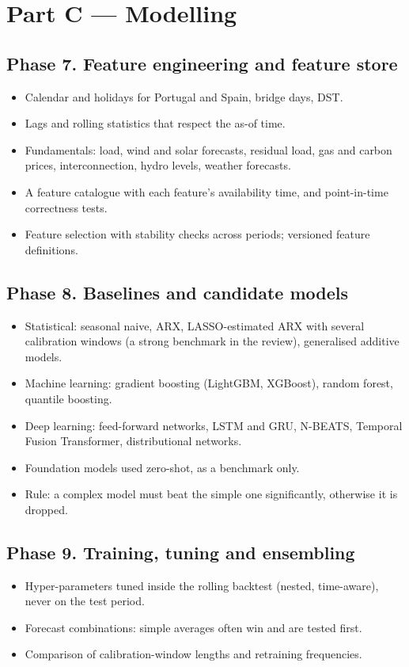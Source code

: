 \documentclass[11pt,a4paper]{article}
\begin{document}
\section{Part C --- Modelling}

\subsection{Phase 7. Feature engineering and feature store}
\begin{itemize}
\item Calendar and holidays for Portugal and Spain, bridge days, DST.
\item Lags and rolling statistics that respect the as-of time.
\item Fundamentals: load, wind and solar forecasts, residual load, gas and carbon prices, interconnection, hydro
  levels, weather forecasts.
\item A feature catalogue with each feature's availability time, and point-in-time correctness tests.
\item Feature selection with stability checks across periods; versioned feature definitions.
\end{itemize}

\subsection{Phase 8. Baselines and candidate models}
\begin{itemize}
\item Statistical: seasonal naive, ARX, LASSO-estimated ARX with several calibration windows (a strong benchmark in
  the review), generalised additive models.
\item Machine learning: gradient boosting (LightGBM, XGBoost), random forest, quantile boosting.
\item Deep learning: feed-forward networks, LSTM and GRU, N-BEATS, Temporal Fusion Transformer, distributional networks.
\item Foundation models used zero-shot, as a benchmark only.
\item Rule: a complex model must beat the simple one significantly, otherwise it is dropped.
\end{itemize}

\subsection{Phase 9. Training, tuning and ensembling}
\begin{itemize}
\item Hyper-parameters tuned inside the rolling backtest (nested, time-aware), never on the test period.
\item Forecast combinations: simple averages often win and are tested first.
\item Comparison of calibration-window lengths and retraining frequencies.
\end{itemize}
\end{document}
